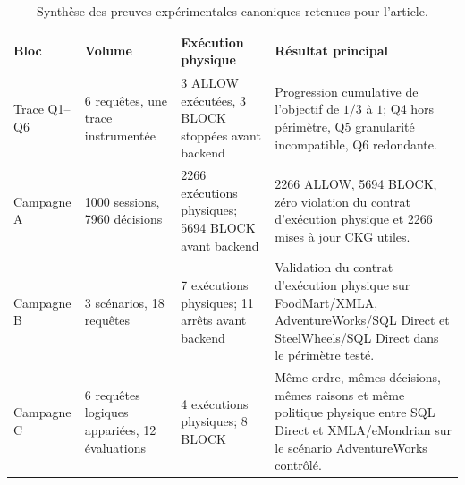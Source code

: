 \begin{table}[t]
\centering
\caption{Synthèse des preuves expérimentales canoniques retenues pour l'article.}
\label{tab:experimental-evidence-final}
\small
\begin{tabular}{p{}p{}p{}p{}}
\hline
Bloc & Volume & Exécution physique & Résultat principal \\
\hline
Trace Q1--Q6
& 6 requêtes, une trace instrumentée
& 3 ALLOW exécutées, 3 BLOCK stoppées avant backend
& Progression cumulative de l'objectif de $1/3$ à $1$; Q4 hors périmètre, Q5 granularité incompatible, Q6 redondante. \\

Campagne A
& 1000 sessions, 7960 décisions
& 2266 exécutions physiques; 5694 BLOCK avant backend
& 2266 ALLOW, 5694 BLOCK, zéro violation du contrat d'exécution physique et 2266 mises à jour CKG utiles. \\

Campagne B
& 3 scénarios, 18 requêtes
& 7 exécutions physiques; 11 arrêts avant backend
& Validation du contrat d'exécution physique sur FoodMart/XMLA, AdventureWorks/SQL Direct et SteelWheels/SQL Direct dans le périmètre testé. \\

Campagne C
& 6 requêtes logiques appariées, 12 évaluations
& 4 exécutions physiques; 8 BLOCK
& Même ordre, mêmes décisions, mêmes raisons et même politique physique entre SQL Direct et XMLA/eMondrian sur le scénario AdventureWorks contrôlé. \\
\hline
\end{tabular}
\end{table}
